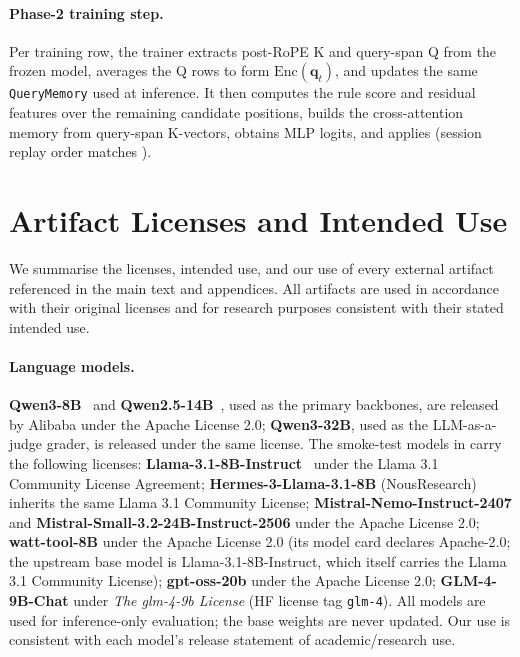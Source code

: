 \documentclass[11pt]{article}
\newcommand{\learn}{Phase-2\xspace}
\begin{document}
\paragraph{\learn training step.}
Per training row, the trainer extracts post-RoPE K and query-span
Q from the frozen model, averages the Q rows to form
$\mathrm{Enc}(\mathbf{q}_t)$, and updates the same
\texttt{QueryMemory} used at inference. It then computes the rule
score and residual features over the remaining candidate
positions, builds the cross-attention memory from query-span
K-vectors, obtains MLP logits, and applies 
(session replay order matches ).

\section{Artifact Licenses and Intended Use}
\label{appendix:artifact-licenses}

We summarise the licenses, intended use, and our use of every
external artifact referenced in the main text and appendices.
All artifacts are used in accordance with their original licenses
and for research purposes consistent with their stated intended use.

\paragraph{Language models.}
\textbf{Qwen3-8B}~\citep{yang2025qwen3} and
\textbf{Qwen2.5-14B}~\citep{qwen2025qwen25technicalreport}, used as
the primary backbones, are released by Alibaba under the Apache
License 2.0; \textbf{Qwen3-32B}, used as the LLM-as-a-judge grader,
is released under the same license. The smoke-test models in
 carry the following licenses:
\textbf{Llama-3.1-8B-Instruct}~\citep{grattafiori2024llama} under
the Llama 3.1 Community License Agreement;
\textbf{Hermes-3-Llama-3.1-8B} (NousResearch) inherits the same
Llama 3.1 Community License;
\textbf{Mistral-Nemo-Instruct-2407} and
\textbf{Mistral-Small-3.2-24B-Instruct-2506} under the Apache
License 2.0; \textbf{watt-tool-8B} under the Apache License 2.0
(its model card declares Apache-2.0; the upstream base model is
Llama-3.1-8B-Instruct, which itself carries the Llama 3.1 Community
License); \textbf{gpt-oss-20b} under the Apache License 2.0;
\textbf{GLM-4-9B-Chat} under \textit{The glm-4-9b License} (HF
license tag \texttt{glm-4}).
All models are used for inference-only evaluation; the base
weights are never updated. Our use is consistent with each
model's release statement of academic/research use.
\end{document}
